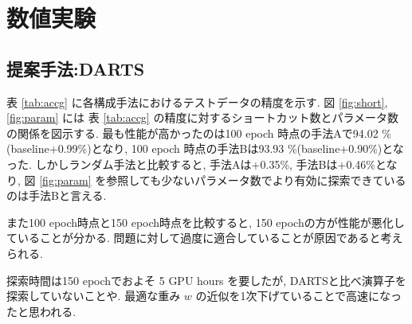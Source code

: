 \newpage
\changeindent{0cm}
\section{数値実験}
\label{sec:exp}
\changeindent{2cm}


\changeindent{0cm}
\subsection{提案手法:DARTS}
\label{sec:exp.01}
\changeindent{2cm}

表 \ref{tab:accg} に各構成手法におけるテストデータの精度を示す.
図 \ref{fig:short}, \ref{fig:param} には
表 \ref{tab:accg} の精度に対するショートカット数とパラメータ数の関係を図示する.
最も性能が高かったのは100 epoch 時点の手法Aで94.02 \%(baseline+0.99\%)となり,
100 epoch 時点の手法Bは93.93 \%(baseline+0.90\%)となった.
しかしランダム手法と比較すると, 手法Aは+0.35\%, 手法Bは+0.46\%となり,
図 \ref{fig:param} を参照しても少ないパラメータ数でより有効に探索できているのは手法Bと言える.

また100 epoch時点と150 epoch時点を比較すると, 150 epochの方が性能が悪化していることが分かる.
問題に対して過度に適合していることが原因であると考えられる.

探索時間は150 epochでおよそ 5 GPU hours を要したが, DARTSと比べ演算子を探索していないことや.
最適な重み $w$ の近似を1次下げていることで高速になったと思われる.



